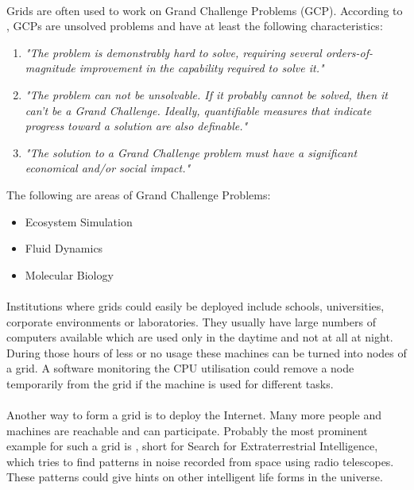 \paragraph{}
Grids are often used to work on Grand Challenge Problems (GCP). According to , GCPs are unsolved problems and have at least the following characteristics:
\begin{enumerate}
\item \textit{"The problem is demonstrably hard to solve, requiring several orders-of-magnitude improvement in the capability required to solve it."}
\item \textit{"The problem can not be unsolvable. If it probably cannot be solved, then it can't be a Grand Challenge. Ideally, quantifiable measures that indicate progress toward a solution are also definable."}
\item \textit{"The solution to a Grand Challenge problem must have a significant economical and/or social impact."}
\end{enumerate}
The following are areas of Grand Challenge Problems:
\begin{itemize}
\item Ecosystem Simulation
\item Fluid Dynamics
\item Molecular Biology
\end{itemize}

\paragraph{}
Institutions where grids could easily be deployed include schools, universities, corporate environments or laboratories. They usually have large numbers of computers available which are used only in the daytime and not at all at night. During those hours of less or no usage these machines can be turned into nodes of a grid. A software monitoring the CPU utilisation could remove a node temporarily from the grid if the machine is used for different tasks.

\paragraph{}
Another way to form a grid is to deploy the Internet. Many more people and machines are reachable and can participate. Probably the most prominent example for such a grid is , short for Search for Extraterrestrial Intelligence, which tries to find patterns in noise recorded from space using radio telescopes. These patterns could give hints on other intelligent life forms in the universe.


